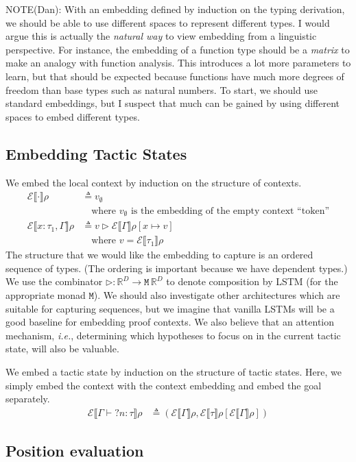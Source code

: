\documentclass{article}
\newcommand\ie{\textit{i.e.}}
\newcommand{\R}{\mathbb{R}}
\newcommand\mE{\mathcal{E}}
\newcommand{\eqdef}[0]{\triangleq}
\newcommand\evar[1]{?#1}
\newcommand\typ{\tau}
\newcommand\ctx{\Gamma}
\newcommand\denote[1]{\llbracket#1\rrbracket}
\newcommand\env{\rho}
\newcommand\embedenv[1]{\mE\denote{#1}\env}
\begin{document}
NOTE(Dan): With an embedding defined by induction on the typing
derivation, we should be able to use different spaces to represent
different types. I would argue this is actually the \emph{natural way}
to view embedding from a linguistic perspective. For instance, the
embedding of a function type should be a \emph{matrix} to make an
analogy with function analysis. This introduces a lot more parameters
to learn, but that should be expected because functions have much more
degrees of freedom than base types such as natural numbers. To start,
we should use standard embeddings, but I suspect that much can be
gained by using different spaces to embed different types.


\subsection{Embedding Tactic States}

We embed the local context by induction on the structure of
contexts.
\begin{align*}
  \embedenv{\cdot} & \eqdef v_\emptyset \\
  & \quad\mbox{where $v_\emptyset$ is the embedding of the empty context ``token''} \\
  \embedenv{x: \typ_1, \ctx} & \eqdef v \rhd \embedenv{\ctx}[x \mapsto v] \\
  & \quad\mbox{where $v = \embedenv{\typ_1}$}
\end{align*}
The structure that we would like the embedding to capture is an
ordered sequence of types. (The ordering is important because we have
dependent types.) We use the combinator $\rhd: \R^D \rightarrow
\texttt{M} \, \R^D$ to denote composition by LSTM (for the appropriate
monad $\texttt{M}$). We should also investigate other architectures
which are suitable for capturing sequences, but we imagine that
vanilla LSTMs will be a good baseline for embedding proof contexts. We
also believe that an attention mechanism, \ie, determining which
hypotheses to focus on in the current tactic state, will also be
valuable.

We embed a tactic state by induction on the structure of tactic
states. Here, we simply embed the context with the context embedding
and embed the goal separately.
\begin{align*}
  \embedenv{\ctx \vdash \evar{n}: \typ} & \eqdef (\embedenv{\ctx}, \embedenv{\typ}[\embedenv{\ctx}])
\end{align*}


\subsection{Position evaluation}
\end{document}
